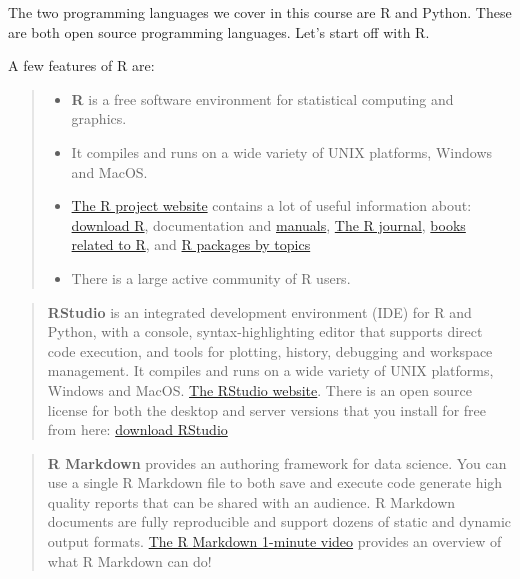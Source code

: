 \documentclass[
  letterpaper,
  DIV=11,
  numbers=noendperiod]{scrreprt}
\providecommand{\tightlist}{%
  \setlength{\itemsep}{0pt}\setlength{\parskip}{0pt}}\usepackage{longtable,booktabs,array}
\begin{document}

The two programming languages we cover in this course are R and Python.
These are both open source programming languages. Let's start off with
R.

A few features of R are:

\begin{quote}
\begin{itemize}
\tightlist
\item
  \textbf{R} is a free software environment for statistical computing
  and graphics.
\item
  It compiles and runs on a wide variety of UNIX platforms, Windows and
  MacOS.
\item
  \href{https://www.r-project.org/}{The R project website} contains a
  lot of useful information about:
  \href{https://cran.r-project.org/mirrors.html}{download R},
  documentation and
  \href{https://cran.r-project.org/manuals.html}{manuals},
  \href{https://journal.r-project.org/}{The R journal},
  \href{https://www.r-project.org/doc/bib/R-books.html}{books related to
  R}, and \href{https://cran.r-project.org/web/views/}{R packages by
  topics}
\item
  There is a large active community of R users.
\end{itemize}
\end{quote}

\begin{quote}
\textbf{RStudio} is an integrated development environment (IDE) for R
and Python, with a console, syntax-highlighting editor that supports
direct code execution, and tools for plotting, history, debugging and
workspace management. It compiles and runs on a wide variety of UNIX
platforms, Windows and MacOS. \href{https://www.rstudio.com/}{The
RStudio website}. There is an open source license for both the desktop
and server versions that you install for free from here:
\href{https://www.rstudio.com/products/rstudio/download/}{download
RStudio}
\end{quote}

\begin{quote}
\textbf{R Markdown} provides an authoring framework for data science.
You can use a single R Markdown file to both save and execute code
generate high quality reports that can be shared with an audience. R
Markdown documents are fully reproducible and support dozens of static
and dynamic output formats.
\href{https://rmarkdown.rstudio.com/lesson-1.html}{The R Markdown
1-minute video} provides an overview of what R Markdown can do!
\end{quote}
\end{document}
